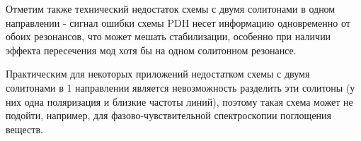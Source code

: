 Отметим также технический недостаток схемы с двумя солитонами в одном направлении - сигнал ошибки схемы PDH несет информацию одновременно от обоих резонансов, что может мешать стабилизации, особенно при наличии эффекта пересечения мод хотя бы на одном солитонном резонансе.

Практическим для некоторых приложений недостатком схемы с двумя солитонами в 1 направлении является невозможность разделить эти солитоны (у них одна поляризация и близкие частоты линий), поэтому такая схема может не подойти, например, для фазово-чувствительной спектроскопии поглощения веществ. 